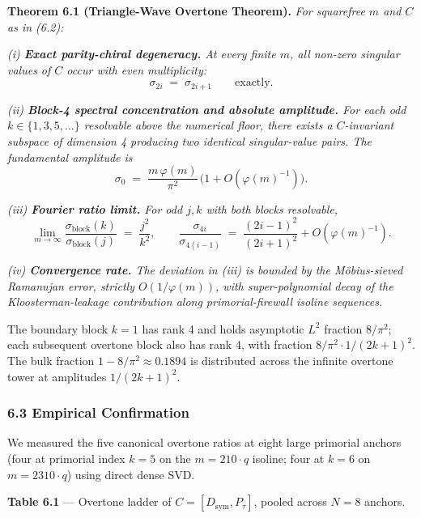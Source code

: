 \documentclass[
  11pt,
]{article}
\begin{document}
\textbf{Theorem 6.1 (Triangle-Wave Overtone Theorem).} \emph{For
squarefree \(m\) and \(C\) as in (6.2):}

\emph{(i) \textbf{Exact parity-chiral degeneracy.} At every finite
\(m\), all non-zero singular values of \(C\) occur with even
multiplicity:}
\[\sigma_{2i} \;=\; \sigma_{2i+1} \qquad \text{exactly.} \tag{6.3}\]

\emph{(ii) \textbf{Block-4 spectral concentration and absolute
amplitude.} For each odd \(k \in \{1, 3, 5, \ldots\}\) resolvable above
the numerical floor, there exists a \(C\)-invariant subspace of
dimension 4 producing two identical singular-value pairs. The
fundamental amplitude is}
\[\sigma_0 \;=\; \frac{m\,\varphi(m)}{\pi^2}\,\bigl(1 + O(\varphi(m)^{-1})\bigr). \tag{6.4}\]

\emph{(iii) \textbf{Fourier ratio limit.} For odd \(j, k\) with both
blocks resolvable,}
\[\lim_{m \to \infty} \frac{\sigma_\text{block}(k)}{\sigma_\text{block}(j)} \;=\; \frac{j^2}{k^2}, \qquad \frac{\sigma_{4i}}{\sigma_{4(i-1)}} \;=\; \frac{(2i-1)^2}{(2i+1)^2} + O(\varphi(m)^{-1}). \tag{6.5}\]

\emph{(iv) \textbf{Convergence rate.} The deviation in (iii) is bounded
by the Möbius-sieved Ramanujan error, strictly \(O(1/\varphi(m))\), with
super-polynomial decay of the Kloosterman-leakage contribution along
primorial-firewall isoline sequences.}

The boundary block \(k = 1\) has rank 4 and holds asymptotic \(L^2\)
fraction \(8/\pi^2\); each subsequent overtone block also has rank 4,
with fraction \(8/\pi^2 \cdot 1/(2k+1)^2\). The bulk fraction
\(1 - 8/\pi^2 \approx 0.1894\) is distributed across the infinite
overtone tower at amplitudes \(1/(2k+1)^2\).

\subsubsection{6.3 Empirical Confirmation}\label{empirical-confirmation}

We measured the five canonical overtone ratios at eight large primorial
anchors (four at primorial index \(k = 5\) on the \(m = 210 \cdot q\)
isoline; four at \(k = 6\) on \(m = 2310 \cdot q\)) using direct dense
SVD.

\textbf{Table 6.1} --- Overtone ladder of
\(C = [D_\text{sym}, P_\tau]\), pooled across \(N = 8\) anchors.
\end{document}

